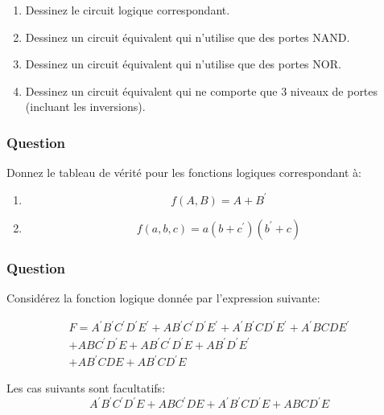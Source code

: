 \documentclass[11pt]{article}
\begin{document}
\begin{enumerate}
\item Dessinez le circuit logique correspondant.

\item Dessinez un circuit équivalent qui n'utilise que des portes
NAND.

\item Dessinez un circuit équivalent qui n'utilise que des portes
NOR.

\item Dessinez un circuit équivalent qui ne comporte que 3 niveaux de
portes (incluant les inversions).
\end{enumerate}

\subsubsection*{Question}
\label{sec:orgca0f0ca}
Donnez le tableau de vérité pour les fonctions logiques correspondant
  à:

\begin{enumerate}
\item $$f(A, B) = A + B^{\prime}$$

\item $$f(a, b, c) = a(b+c^{\prime})(b^{\prime}+c)$$
\end{enumerate}

\subsubsection*{Question}
\label{sec:orgb82c022}
Considérez la fonction logique donnée par l'expression suivante:

\begin{multline*}
F = A^{\prime} B^{\prime} C^{\prime} D^{\prime} E^{\prime} + {A} B^{\prime} C^{\prime} D^{\prime} E^{\prime} + A^{\prime} B^{\prime} {C} D^{\prime} E^{\prime} + A^{\prime} {B} {C} {D} E^{\prime} \\ + {A} {B} C^{\prime} D^{\prime} {E} + {A} B^{\prime} C^{\prime} D^{\prime} {E} + {A} B^{\prime} D^{\prime} E^{\prime} \\ + {A} B^{\prime} {C} {D} {E} + {A} B^{\prime}  {C} D^{\prime} {E}
\end{multline*}

Les cas suivants sont facultatifs:
\begin{displaymath}
A^{\prime} B^{\prime} C^{\prime} D^{\prime} {E} + {A} {B} C^{\prime} {D} {E} +  A^{\prime}B^{\prime} {C} D^{\prime} {E} + {A} {B} {C} D^{\prime} {E}
\end{displaymath}
\end{document}
